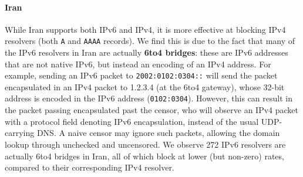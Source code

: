 {{%





\paragraph{Iran}
While Iran supports both IPv6 and IPv4, it is more effective at blocking IPv4
resolvers (both \texttt{A} and \texttt{AAAA} records). We find this is due to
the fact that many of the IPv6 resolvers in Iran are actually \textbf{6to4 bridges}: these
are IPv6 addresses that are not native IPv6, but instead an encoding of an IPv4
address. For example, sending an IPv6 packet to \texttt{2002:0102:0304::} will
send the packet encapsulated in an IPv4 packet to 1.2.3.4 (at the 6to4 gateway),
whose 32-bit address is encoded in the IPv6 address (\texttt{0102:0304}).
However, this can result in the packet passing encapsulated past the censor, who
will observe an IPv4 packet with a protocol field denoting IPv6 encapsulation,
instead of the usual UDP-carrying DNS. A naive censor may ignore such packets,
allowing the domain lookup through unchecked and uncensored. We observe 272 IPv6
resolvers are actually 6to4 bridges in Iran, all of which block at lower
(but non-zero) rates, compared to their corresponding IPv4 resolver.

%




}}
